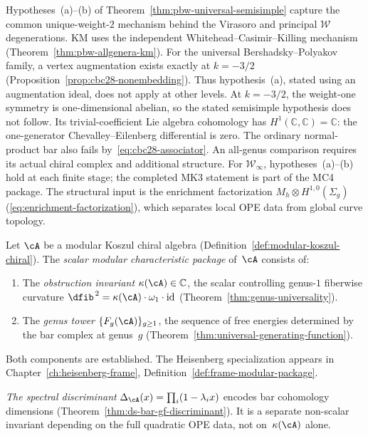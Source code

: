 \begin{remark}
\label{rem:pbw-universal-scope}
Hypotheses~(a)--(b) of Theorem~\ref{thm:pbw-universal-semisimple}
capture the common unique-weight-$2$ mechanism behind the Virasoro
and principal $\mathcal{W}$ degenerations.
KM uses the independent Whitehead--Casimir--Killing mechanism
(Theorem~\ref{thm:pbw-allgenera-km}).
For the universal Bershadsky--Polyakov family, a vertex augmentation exists exactly at $k=-3/2$
(Proposition~\ref{prop:cbc28-nonembedding}).
Thus hypothesis~(a), stated using an augmentation ideal, does not apply at other levels.
At $k=-3/2$, the weight-one symmetry is one-dimensional abelian, so the stated semisimple hypothesis does not follow.
Its trivial-coefficient Lie algebra cohomology has $H^1(\mathbb C,\mathbb C)=\mathbb C$:
the one-generator Chevalley--Eilenberg differential is zero.
The ordinary normal-product bar also fails by~\eqref{eq:cbc28-associator}.
An all-genus comparison requires its actual chiral complex and additional structure.
For $\mathcal{W}_\infty$, hypotheses~(a)--(b) hold at each finite
stage; the completed MK3 statement is part of the MC4 package.
The structural input is the enrichment factorization
$M_h \otimes H^{1,0}(\Sigma_g)$
(\ref{eq:enrichment-factorization}), which separates local OPE
data from global curve topology.
\end{remark}

\begin{definition}
\label{def:modular-characteristic-package}
\label{def:scalar-modular-package}
Let $\cA$ be a modular Koszul chiral algebra
(Definition~\ref{def:modular-koszul-chiral}).  The
\emph{scalar modular characteristic package} of~$\cA$ consists of:
\begin{enumerate}[label=\textup{(\roman*)}]
\item The \emph{obstruction invariant}
  $\kappa(\cA) \in \mathbb{C}$, the scalar controlling genus-$1$
  fiberwise curvature $\dfib^{\,2} = \kappa(\cA) \cdot \omega_1 \cdot \operatorname{id}$
  (Theorem~\ref{thm:genus-universality}).
\item The \emph{genus tower} $\{F_g(\cA)\}_{g \geq 1}$, the sequence
  of free energies determined by the bar complex at genus~$g$
  (Theorem~\ref{thm:universal-generating-function}).
\end{enumerate}
Both components are established.  The Heisenberg specialization
appears in Chapter~\ref{ch:heisenberg-frame},
Definition~\ref{def:frame-modular-package}.

\smallskip
\emph{The spectral discriminant}
$\Delta_{\cA}(x) = \prod_i (1 - \lambda_i x)$
encodes bar cohomology dimensions
(Theorem~\ref{thm:ds-bar-gf-discriminant}).
It is a separate non-scalar invariant depending on
the full quadratic OPE data, not
on~$\kappa(\cA)$ alone.
\end{definition}

